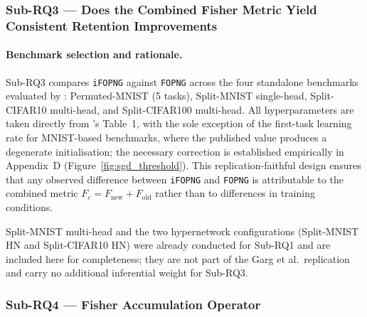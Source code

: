 \subsubsection{Sub-RQ3 --- Does the Combined Fisher Metric Yield Consistent Retention Improvements}
\label{sec:design_rq3}

\paragraph{Benchmark selection and rationale.}
Sub-RQ3 compares \texttt{iFOPNG} against \texttt{FOPNG} across the four
standalone benchmarks evaluated by \citet{garg_fisher-orthogonal_2026}:
Permuted-MNIST (5 tasks), Split-MNIST single-head, Split-CIFAR10
multi-head, and Split-CIFAR100 multi-head.
All hyperparameters are taken directly from \citeauthor{garg_fisher-orthogonal_2026}'s
Table~1, with the sole exception of the first-task learning rate for
MNIST-based benchmarks, where the published value produces a degenerate
initialisation; the necessary correction is established empirically in
Appendix~D (Figure~\ref{fig:sgd_threshold}).
This replication-faithful design ensures that any observed difference
between \texttt{iFOPNG} and \texttt{FOPNG} is attributable to the combined
metric $F_c = F_\mathrm{new} + F_\mathrm{old}$ rather than
to differences in training conditions.

Split-MNIST multi-head and the two hypernetwork configurations
(Split-MNIST HN and Split-CIFAR10 HN) were already conducted for
Sub-RQ1 and are included here for completeness; they are not part of the
Garg et al.\ replication and carry no additional inferential weight for
Sub-RQ3.

\subsubsection{Sub-RQ4 --- Fisher Accumulation Operator}
\label{sec:design_rq4}

